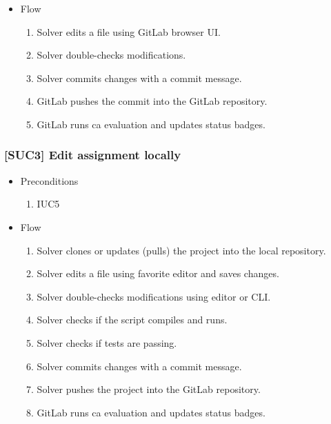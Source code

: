 \begin{itemize}
\item
  {Flow}
    \begin{enumerate}
    \item
      {Solver edits a file using GitLab browser UI.}
    \item
      {Solver double-checks modifications.}
    \item
      {Solver commits changes with a commit message.}
    \item
      {GitLab pushes the commit into the GitLab repository.}
    \item
      {GitLab runs ca evaluation and updates status badges.}
    \end{enumerate}
\end{itemize}

\subsubsection{{[}SUC3{]} Edit assignment locally}

\begin{itemize}
\item
  {Preconditions}
    \begin{enumerate}
    \item
      {IUC5}
    \end{enumerate}
\end{itemize}

\begin{itemize}
\item
  {Flow}
    \begin{enumerate}
    \item
      {Solver clones or updates (pulls) the project into the local repository.}
    \item
      {Solver edits a file using favorite editor and saves changes.}
    \item
      {Solver double-checks modifications using editor or CLI.}
    \item
      {Solver checks if the script compiles and runs.}
    \item
      {Solver checks if tests are passing.}
    \item
      {Solver commits changes with a commit message.}
    \item
      {Solver pushes the project into the GitLab repository.}
    \item
      {GitLab runs ca evaluation and updates status badges.}
    \end{enumerate}
\end{itemize}

